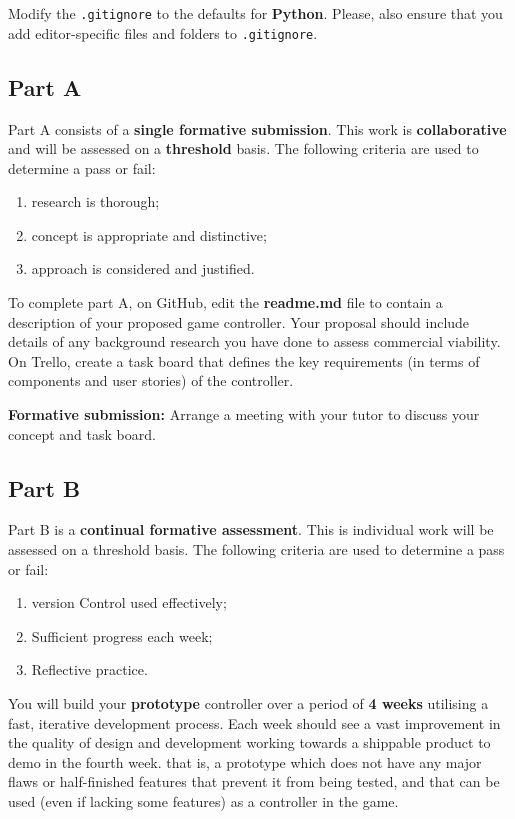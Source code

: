 \documentclass{../fal_assignment}
\begin{document}
Modify the \texttt{.gitignore} to the defaults for \textbf{Python}. Please, also ensure that you add editor-specific files and folders to \texttt{.gitignore}. 

\subsection*{Part A}

Part A consists of a \textbf{single formative submission}. This work is \textbf{collaborative} and will be assessed on a \textbf{threshold} basis. The following criteria are used to determine a pass or fail:

\begin{enumerate}[label=(\alph*)]
	\item research is thorough;
	\item concept is appropriate and distinctive;
	\item approach is considered and justified.
\end{enumerate}

To complete part A, on GitHub, edit the \textbf{readme.md} file to contain a description of your proposed game controller. Your proposal should include details of any background research you have done to assess commercial viability. On Trello, create a task board that defines the key requirements (in terms of components and user stories) of the controller. 

\textbf{Formative submission:} Arrange a meeting with your tutor to discuss your concept and task board. 

\subsection*{Part B}

Part B is a \textbf{continual formative assessment}. This is individual work will be assessed on a threshold basis. The following criteria are used to determine a pass or fail:

\begin{enumerate}[label=(\alph*)]
	\item version Control used effectively;
	\item Sufficient progress each week;
	\item Reflective practice.
\end{enumerate}

You will build your \textbf{prototype} controller over a period of \textbf{4 weeks} utilising a fast, iterative development process. Each week should see a vast improvement in the quality of design and development working towards a shippable product to demo in the fourth week. that is, a prototype which does not have any major flaws or half-finished features that prevent it from being tested, and that can be used (even if lacking some features) as a controller in the game. 
\end{document}
